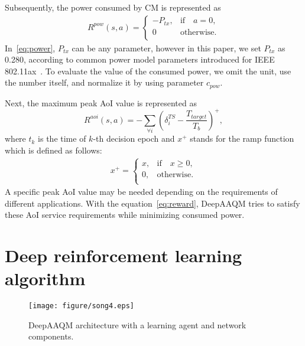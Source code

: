 \documentclass[journal]{IEEEtran}
\begin{document}
Subsequently, the power consumed by CM is represented as
\begin{equation}
\begin{split}
    R^{pow}(s, a) = \left\{ {
    \begin{array}{*{20}{l}}
        {-P_{tx},} & {\textrm{if} \quad a = 0,} \\ 
        0 & {\textrm{otherwise}. } \\ 
    \end{array}} \right.
\label{eq:power}
\end{split}
\end{equation}
In~\eqref{eq:power}, $P_{tx}$ can be any parameter, however in this paper, we set $P_{tx}$ as 0.280, according to common power model parameters introduced for IEEE 802.11ax~\cite{14/0980}. To evaluate the value of the consumed power, we omit the unit, use the number itself, and normalize it by using parameter $c_{pow}$.

Next, the maximum peak AoI value is represented as 
\begin{equation}
    R^{aoi}(s, a) = -\sum_{\forall i} \left(\delta_i^{TS}-\frac{T_{target}}{T_b} \right)^{+},
\label{eq:peakaoi}
\end{equation}
where $t_k$ is the time of $k$-th decision epoch and $x^{+}$ stands for the ramp function which is defined as follows:
\begin{equation}
\begin{split}
    x^{+} = \left\{ {
    \begin{array}{*{20}{l}}
        {x,} & {\textrm{if} \quad x \geq 0,} \\ 
        {0,} & {\textrm{otherwise}. } \\ 
    \end{array}} \right.
\label{eq:ramp}
\end{split}
\end{equation}
A specific peak AoI value may be needed depending on the requirements of different applications. With the equation~\eqref{eq:reward}, DeepAAQM tries to satisfy these AoI service requirements while minimizing consumed power.


\section{Deep reinforcement learning algorithm}
\label{sec:drl}

\begin{figure*}[!htbp]
\centering
\texttt{[image: figure/song4.eps]}
\caption{DeepAAQM architecture with a learning agent and network components.}
\label{fig:architecture}
\end{figure*}
\end{document}
